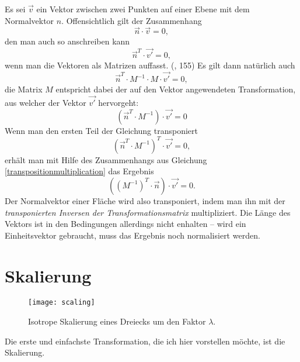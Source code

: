 Es sei $\vec v$ ein Vektor zwischen zwei Punkten auf einer Ebene mit dem Normalvektor $n$. Offensichtlich gilt der Zusammenhang
\begin{equation}
 \vec n \cdot \vec v = 0,
\end{equation}
den man auch so anschreiben kann
\begin{equation}
 \vec{n}^T \cdot \vec{v'} = 0,
\end{equation}
wenn man die Vektoren als Matrizen auffasst. (\vgl \citep{script:german}, 155) Es gilt dann natürlich auch
\begin{equation}
 \vec{n}^T \cdot M^{-1} \cdot M \cdot \vec{v'} = 0,
\end{equation}
die Matrix $M$ entspricht dabei der auf den Vektor angewendeten Transformation, aus welcher der Vektor $\vec{v'}$ hervorgeht:
\begin{equation}
 \left( \vec{n}^T \cdot M^{-1} \right) \cdot \vec{v'} = 0
\end{equation}
Wenn man den ersten Teil der Gleichung transponiert
\begin{equation}
 \left( \vec{n}^T \cdot M^{-1} \right)^T \cdot \vec{v'} = 0,
\end{equation}
erhält man mit Hilfe des Zusammenhangs aus Gleichung \ref{transpositionmultiplication} das Ergebnis
\begin{equation}
 \left( \left(M^{-1}\right)^T \cdot \vec{n} \right) \cdot \vec{v'} = 0.
\end{equation}
Der Normalvektor einer Fläche wird also transponiert, indem man ihn mit der \emph{transponierten Inversen der Transformationsmatrix} multipliziert. Die Länge des Vektors ist in den Bedingungen allerdings nicht enhalten -- wird ein Einheitsvektor gebraucht, muss das Ergebnis noch normalisiert werden.

\section{Skalierung}
\label{scaling}

\begin{wrapfigure}{r}{0.5\textwidth}
  \vspace{-10pt}
  \texttt{[image: scaling]}
  \vspace{-10pt}
  \caption{Isotrope Skalierung eines Dreiecks um den Faktor $\lambda$.}
\end{wrapfigure}

Die erste und einfachste Transformation, die ich hier vorstellen möchte, ist die Skalierung.

